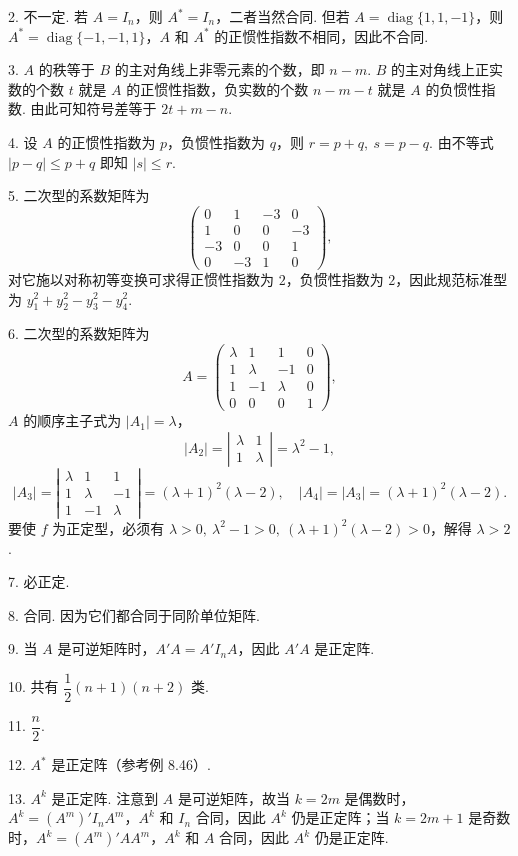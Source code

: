 \documentclass[UTF8,12pt,a4paper,fontset=fandol]{ctexart}
\begin{document}
2. 不一定. 若 $A=I_n$，则 $A^*=I_n$，二者当然合同. 但若 $A=\operatorname{diag}\{1,1,-1\}$，则 $A^*=\operatorname{diag}\{-1,-1,1\}$，$A$ 和 $A^*$ 的正惯性指数不相同，因此不合同.

3. $A$ 的秩等于 $B$ 的主对角线上非零元素的个数，即 $n-m$. $B$ 的主对角线上正实数的个数 $t$ 就是 $A$ 的正惯性指数，负实数的个数 $n-m-t$ 就是 $A$ 的负惯性指数. 由此可知符号差等于 $2t+m-n$.

4. 设 $A$ 的正惯性指数为 $p$，负惯性指数为 $q$，则 $r=p+q,\ s=p-q$. 由不等式 $|p-q|\le p+q$ 即知 $|s|\le r$.

5. 二次型的系数矩阵为
\[
\left(\begin{array}{cccc}
0 & 1 & -3 & 0\\
1 & 0 & 0 & -3\\
-3 & 0 & 0 & 1\\
0 & -3 & 1 & 0
\end{array}\right),
\]
对它施以对称初等变换可求得正惯性指数为 $2$，负惯性指数为 $2$，因此规范标准型为 $y_1^2+y_2^2-y_3^2-y_4^2$.

6. 二次型的系数矩阵为
\[
A=\left(\begin{array}{cccc}
\lambda & 1 & 1 & 0\\
1 & \lambda & -1 & 0\\
1 & -1 & \lambda & 0\\
0 & 0 & 0 & 1
\end{array}\right),
\]
$A$ 的顺序主子式为 $|A_1|=\lambda$，
\[
|A_2|=\left|\begin{array}{cc}\lambda&1\\ 1&\lambda\end{array}\right|=\lambda^2-1,
\]
\[
|A_3|=\left|\begin{array}{ccc}\lambda&1&1\\ 1&\lambda&-1\\ 1&-1&\lambda\end{array}\right|=(\lambda+1)^2(\lambda-2),
\quad |A_4|=|A_3|=(\lambda+1)^2(\lambda-2).
\]
要使 $f$ 为正定型，必须有 $\lambda>0,\ \lambda^2-1>0,\ (\lambda+1)^2(\lambda-2)>0$，解得 $\lambda>2$.

7. 必正定.

8. 合同. 因为它们都合同于同阶单位矩阵.

9. 当 $A$ 是可逆矩阵时，$A'A=A'I_nA$，因此 $A'A$ 是正定阵.

10. 共有 $\dfrac12(n+1)(n+2)$ 类.

11. $\dfrac n2$.

12. $A^*$ 是正定阵（参考例 8.46）.

13. $A^k$ 是正定阵. 注意到 $A$ 是可逆矩阵，故当 $k=2m$ 是偶数时，$A^k=(A^m)'I_nA^m$，$A^k$ 和 $I_n$ 合同，因此 $A^k$ 仍是正定阵；当 $k=2m+1$ 是奇数时，$A^k=(A^m)'AA^m$，$A^k$ 和 $A$ 合同，因此 $A^k$ 仍是正定阵.
\end{document}
